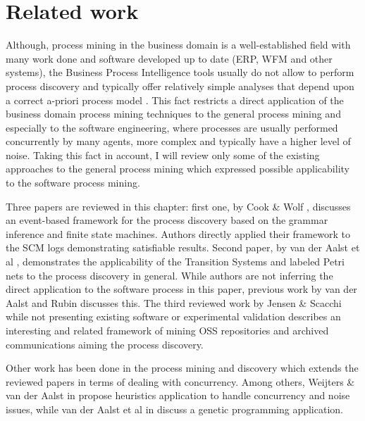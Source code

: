 \chapter{Related work}
Although, process mining in the business domain is a well-established field with many work done and software developed up to date (ERP, WFM and other systems), the Business Process Intelligence tools usually do not allow to perform process discovery and typically offer relatively simple analyses that depend upon a correct a-priori process model \cite{citeulike:3718014} \cite{citeulike:5044991}. This fact restricts a direct application of the business domain process mining techniques to the general process mining and especially to the software engineering, where processes are usually performed concurrently by many agents, more complex and typically have a higher level of noise. Taking this fact in account, I will review only some of the existing approaches to the general process mining which expressed possible applicability to the software process mining. 

Three papers are reviewed in this chapter: first one, by Cook \& Wolf \cite{citeulike:328044}, discusses an event-based framework for the process discovery based on the grammar inference and finite state machines. Authors directly applied their framework to the SCM logs demonstrating satisfiable results. Second paper, by van der Aalst et al \cite{citeulike:3718014}, demonstrates the applicability of the Transition Systems and labeled Petri nets to the process discovery in general. While authors are not inferring the direct application to the software process in this paper, previous work by van der Aalst and Rubin \cite{citeulike:1885717} discusses this. The third reviewed work by Jensen \& Scacchi while not presenting existing software or experimental validation describes an interesting and related framework of mining OSS repositories and archived communications aiming the process discovery. 

Other work has been done in the process mining and discovery which extends the reviewed papers in terms of dealing with concurrency. Among others, Weijters \& van der Aalst in \cite{citeulike:5128101} propose heuristics application to handle concurrency and noise issues, while van der Aalst et al in \cite{citeulike:5128101} discuss a genetic programming application.